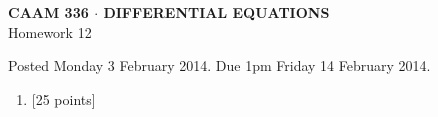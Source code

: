 \documentclass[10pt]{article}
\begin{document}
\vspace*{-5em}
\begin{center}
\large \textsf{\textbf{CAAM 336 $\cdot$ DIFFERENTIAL EQUATIONS}\\[0.5em]
Homework 12 }
\end{center}

Posted Monday 3 February 2014. Due 1pm Friday 14 February 2014.

\begin{enumerate}\addtocounter{enumi}{11}
\item {[25 points]}\\  

\end{enumerate}
\end{document}
